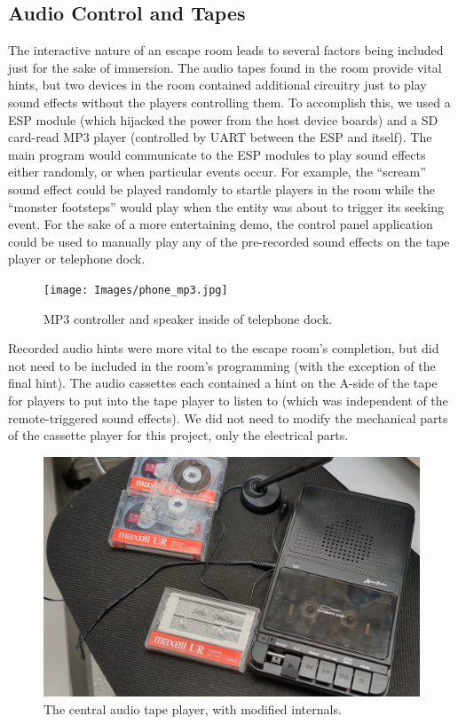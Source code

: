 \documentclass[conference]{IEEEtran}
\begin{document}
\subsection{Audio Control and Tapes} %
The interactive nature of an escape room leads to several factors being included just for the sake of immersion. 
The audio tapes found in the room provide vital hints, but two devices in the room contained additional circuitry 
just to play sound effects without the players controlling them. To accomplish this, we used a ESP module (which 
hijacked the power from the host device boards) and a SD card-read MP3 player (controlled by UART between the ESP and 
itself). The main program would communicate to the ESP modules to play sound effects either randomly, or when particular 
events occur. For example, the ``scream'' sound effect could be played randomly to startle players in the room while the 
``monster footsteps'' would play when the entity was about to trigger its seeking event. For the sake of a more entertaining 
demo, the control panel application could be used to manually play any of the pre-recorded sound effects on the tape player 
or telephone dock.

\begin{figure}[ht]
    \centering
    \texttt{[image: Images/phone\_mp3.jpg]}
    \caption{MP3 controller and speaker inside of telephone dock.}
\end{figure}

\indent Recorded audio hints were more vital to the escape room's completion, but did not need to be included in the room's 
programming (with the exception of the final hint). The audio cassettes each contained a hint on the A-side of the 
tape for players to put into the tape player to listen to (which was independent of the remote-triggered sound effects). 
We did not need to modify the mechanical parts of the cassette player for this project, only the electrical parts.

\begin{figure}[ht]
    \centering
    \includegraphics[width=0.90\columnwidth]{Images/tape_player.png}
    \caption{The central audio tape player, with modified internals.}
\end{figure}
\end{document}
